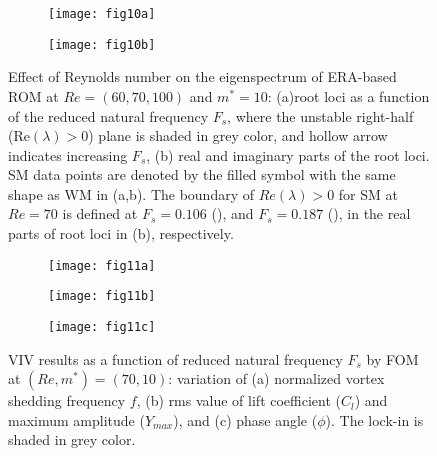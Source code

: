 \documentclass{jfm}
\newcommand{\greendashdot}{\raisebox{2pt}{\tikz{\draw[green,dashdotted,line width=1.2pt](0,0) -- (5mm,0);}}}
\newcommand{\greendash}{\raisebox{2pt}{\tikz{\draw[green,dashed,line width=1.2pt](0,0) -- (5mm,0);}}}
\begin{document}
 \begin{figure}
\centering
\begin{subfigure}{0.495\textwidth}
\centering
    \texttt{[image: fig10a]}
    \caption{}
    \label{fig:dre_eig1}
    \end{subfigure} 
\begin{subfigure}{0.495\textwidth} 
\centering
 \texttt{[image: fig10b]}
	\caption{}
	\label{fig:dre_eig23}
	\end{subfigure}	
\caption{Effect of Reynolds number on the eigenspectrum of ERA-based ROM at $Re=(60,70,100)$ and $m^*=10$:  
        (a)root loci as a function of the reduced natural frequency $F_s$,
        where the unstable right-half (Re$(\lambda) > 0$) plane is shaded in grey color,
        and hollow arrow indicates increasing $F_s$, 
       (b) real and imaginary parts of the root loci.
       SM data points are denoted by the filled symbol with the same shape as WM in (a,b).
       The boundary of $Re(\lambda)>0$ for SM at $Re=70$ is defined at $F_s=0.106$ 
        ({\protect\greendash}), and $F_s=0.187$ ({\protect\greendashdot}), 
       in the real parts of root loci in (b), respectively. 
       }

	\label{fig:dre_eig}
\end{figure}
 
 
 
 \begin{figure}
\centering
\begin{subfigure}{0.495\textwidth}
\centering
    \texttt{[image: fig11a]}
    \caption{}
    \label{fig:m10_re70_fs}
    \end{subfigure} 
\begin{subfigure}{0.495\textwidth} 
\centering
 \texttt{[image: fig11b]}
	\caption{}
	\label{fig:m10_re70_cly}
	\end{subfigure}	
\begin{subfigure}{0.495\textwidth} 
\centering
 \texttt{[image: fig11c]}
	\caption{}
	\label{fig:m10_re70_phi}
	\end{subfigure}	
        \caption{VIV results  as a function of reduced natural frequency $F_s$
 by FOM at $(Re,m^*)=(70,10)$: variation of (a) normalized vortex shedding frequency $f$, 
      (b) rms value of lift coefficient ($C_l$) and maximum amplitude ($Y_{max}$), and
      (c) phase angle ($\phi$).
      The lock-in is shaded in grey color.}
	\label{fig:re70_fem}
\end{figure}
\end{document}
